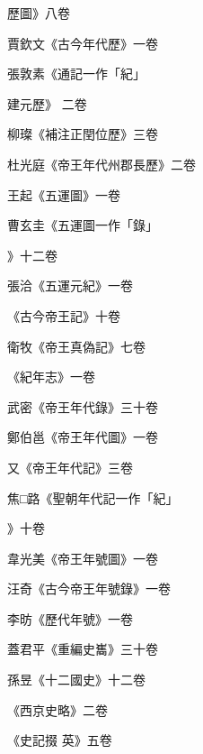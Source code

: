 \begin{pinyinscope}
 歷圖》八卷



 賈欽文《古今年代歷》一卷



 張敦素《通記一作「紀」



 建元歷》
 二卷



 柳璨《補注正閏位歷》三卷



 杜光庭《帝王年代州郡長歷》二卷



 王起《五運圖》一卷



 曹玄圭《五運圖一作「錄」



 》十二卷



 張洽《五運元紀》一卷



 《古今帝王記》十卷



 衛牧《帝王真偽記》七卷



 《紀年志》一卷



 武密《帝王年代錄》三十卷



 鄭伯邕《帝王年代圖》一卷



 又《帝王年代記》三卷



 焦□路《聖朝年代記一作「紀」



 》十卷



 韋光美《帝王年號圖》一卷



 汪奇《古今帝王年號錄》一卷



 李昉《歷代年號》一卷



 蓋君平《重編史巂》三十卷



 孫昱《十二國史》十二卷



 《西京史略》二卷



 《史記掇
 英》五卷




\end{pinyinscope}
